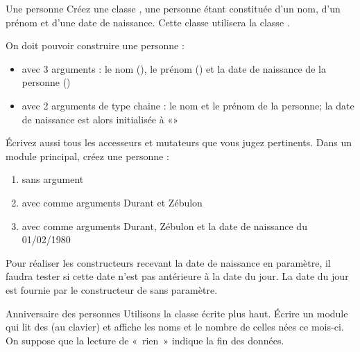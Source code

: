 \begin{Exercice}{Une personne}
	Créez une classe , une personne étant
	constituée d'un nom, d'un prénom et
	d'une date de naissance. Cette classe utilisera la
	classe .

	On doit pouvoir construire une personne :

	\liststyleListi
	\begin{itemize}
		\item 
			avec 3 arguments : le nom (), le prénom
			() et la date de naissance de la personne
			()
		\item 
			avec 2 arguments de type chaine : le nom et le prénom de la personne; la
			date de naissance est alors initialisée à «»
	\end{itemize}

	Écrivez aussi tous les accesseurs et mutateurs que vous jugez
	pertinents. Dans un module principal, créez une personne :

	\begin{enumerate}[label=\alph*)]
		\item 
			sans argument
		\item 
			avec comme arguments {\textquotedbl}Durant{\textquotedbl} et
			{\textquotedbl}Zébulon{\textquotedbl}
		\item 
			avec comme arguments {\textquotedbl}Durant{\textquotedbl},
			{\textquotedbl}Zébulon{\textquotedbl} et la date de naissance du
			01/02/1980
	\end{enumerate}

	Pour réaliser les constructeurs recevant la date de naissance en
	paramètre, il faudra tester si cette date n’est pas antérieure à la
	date du jour. La date du jour est fournie par le constructeur de
	 sans paramètre.
\end{Exercice}

\begin{Exercice}{Anniversaire des personnes}
	Utilisons la classe  écrite plus haut.
	Écrire un module qui lit des  (au clavier)
	et affiche les noms et le nombre de celles nées ce mois-ci. On suppose
	que la lecture de «~rien~» indique la fin des données.
\end{Exercice}


